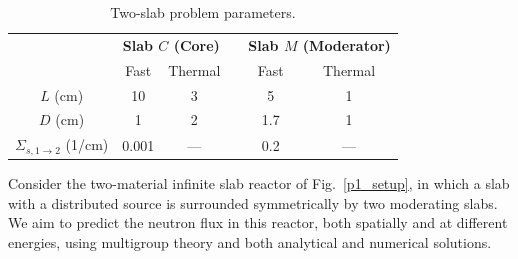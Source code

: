 \documentclass[11pt]{article} %
\newcommand{\figref}[1]{Fig.~\ref{#1}}
\begin{document}
\begin{table}[htb!]
\caption{Two-slab problem parameters.\cite{novak_computer_2026}}
\label{tab:p1-props}
\centering
\begin{tabular}{@{}c | cc c cc @{}}
\toprule
& \multicolumn{2}{c}{\bf Slab $C$ (Core)} & & \multicolumn{2}{c}{\bf Slab $M$ (Moderator)}\\
& Fast & Thermal && Fast & Thermal\\
\midrule
$L$ (cm) & 10 & 3 && 5 & 1\\
$D$ (cm) & 1 & 2 && 1.7 & 1\\
$\Sigma_{s,1\rightarrow2}$ (1/cm) & 0.001 & --- && 0.2 & ---\\
\bottomrule
\end{tabular}
\end{table}

Consider the two-material infinite slab reactor of \figref{p1_setup}, in which a slab with a distributed source is surrounded symmetrically by two moderating slabs.
We aim to predict the neutron flux in this reactor, both spatially and at different energies, using multigroup theory and both analytical and numerical solutions.
\end{document}
